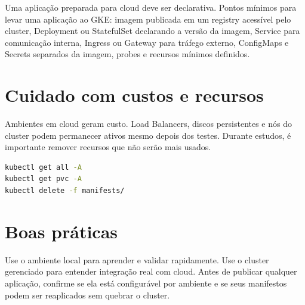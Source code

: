 \documentclass[11pt,a4paper]{article}
\begin{document}
Uma aplicação preparada para cloud deve ser declarativa. Pontos mínimos para levar uma aplicação ao GKE: imagem publicada em um registry acessível pelo cluster, Deployment ou StatefulSet declarando a versão da imagem, Service para comunicação interna, Ingress ou Gateway para tráfego externo, ConfigMaps e Secrets separados da imagem, probes e recursos mínimos definidos.

\section*{\color{primary}Cuidado com custos e recursos}

Ambientes em cloud geram custo. Load Balancers, discos persistentes e nós do cluster podem permanecer ativos mesmo depois dos testes. Durante estudos, é importante remover recursos que não serão mais usados.

\begin{lstlisting}[language=bash]
kubectl get all -A
kubectl get pvc -A
kubectl delete -f manifests/
\end{lstlisting}

\section*{\color{primary}Boas práticas}

Use o ambiente local para aprender e validar rapidamente. Use o cluster gerenciado para entender integração real com cloud. Antes de publicar qualquer aplicação, confirme se ela está configurável por ambiente e se seus manifestos podem ser reaplicados sem quebrar o cluster.
\end{document}
